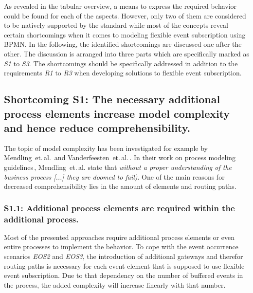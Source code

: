 \medskip \noindent
As revealed in the tabular overview, a means to express the required behavior could be found for each of the aspects.
However, only two of them are considered to be natively supported by the standard while most of the concepts reveal certain shortcomings when it comes to modeling flexible event subscription using BPMN. 
In the following, the identified shortcomings are discussed one after the other. The discussion is arranged into three parts which are specifically marked as \textit{S1} to \textit{S3}. The shortcomings should be specifically addressed in addition to the requirements \textit{R1} to \textit{R3} when developing solutions to flexible event subscription.


\subsection*{Shortcoming S1: The necessary additional process elements increase model complexity and hence reduce comprehensibility.}

The topic of model complexity has been investigated for example by Mendling~et.\,al.\,\cite{mendling2008metrics,mendling2010seven} and Vanderfeesten~et.\,al.\,\cite{vf2007quality}.
In their work on process modeling guidelines\,\cite{mendling2010seven}, Mendling~et.\,al. state that \textit{without a proper understanding of the business process [...] they are doomed to fail)}.
One of the main reasons for decreased comprehensibility lies in the amount of elements and routing paths.

\subsubsection*{S1.1: Additional process elements are required within the additional process.}

Most of the presented approaches require additional process elements or even entire processes to implement the behavior.
To cope with the event occurrence scenarios \textit{EOS2} and \textit{EOS3}, the introduction of additional gateways and therefor routing paths is necessary for each event element that is supposed to use flexible event subscription.
Due to that dependency on the number of buffered events in the process, the added complexity will increase linearly with that number.

